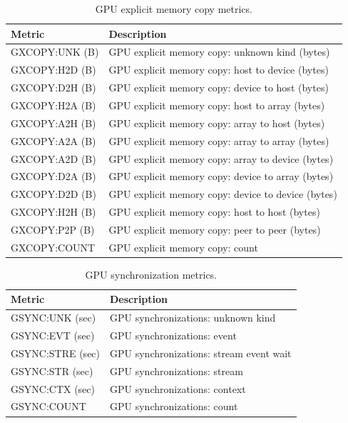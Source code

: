 \begin{table}[t]
\centering
\begin{tabular}{|l|l|}\hline
Metric & Description\\\hline\hline
 GXCOPY:UNK (B)  &  GPU explicit memory copy: unknown kind (bytes)  \\\hline 
  GXCOPY:H2D (B)  &  GPU explicit memory copy: host to device (bytes)  \\\hline 
  GXCOPY:D2H (B)  &  GPU explicit memory copy: device to host (bytes)  \\\hline 
  GXCOPY:H2A (B)  &  GPU explicit memory copy: host to array (bytes)  \\\hline 
  GXCOPY:A2H (B)  &  GPU explicit memory copy: array to host (bytes)  \\\hline 
  GXCOPY:A2A (B)  &  GPU explicit memory copy: array to array (bytes)  \\\hline 
  GXCOPY:A2D (B)  &  GPU explicit memory copy: array to device (bytes)  \\\hline 
  GXCOPY:D2A (B)  &  GPU explicit memory copy: device to array (bytes)  \\\hline 
  GXCOPY:D2D (B)  &  GPU explicit memory copy: device to device (bytes)  \\\hline 
  GXCOPY:H2H (B)  &  GPU explicit memory copy: host to host (bytes)  \\\hline 
  GXCOPY:P2P (B)  &  GPU explicit memory copy: peer to peer (bytes)  \\\hline 
  GXCOPY:COUNT  &  GPU explicit memory copy: count  \\\hline 
\end{tabular}
\caption{GPU explicit memory copy metrics.}
\label{table:gxcopy}
\end{table}


\begin{table}[h]
\centering
\begin{tabular}{|l|l|}\hline
Metric & Description\\\hline\hline
 GSYNC:UNK (sec)  &  GPU synchronizations: unknown kind  \\\hline 
  GSYNC:EVT (sec)  &  GPU synchronizations: event  \\\hline 
  GSYNC:STRE (sec)  &  GPU synchronizations: stream event wait  \\\hline 
  GSYNC:STR (sec)  &  GPU synchronizations: stream  \\\hline 
  GSYNC:CTX (sec)  &  GPU synchronizations: context  \\\hline 
  GSYNC:COUNT  &  GPU synchronizations: count  \\\hline 
\end{tabular}
\caption{GPU synchronization metrics.}
\label{table:gsync}
\end{table}



